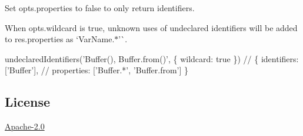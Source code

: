 Set {\ttfamily opts.\+properties} to false to only return identifiers.

When {\ttfamily opts.\+wildcard} is true, unknown uses of undeclared identifiers will be added to {\ttfamily res.\+properties} as `\textquotesingle{}Var\+Name.$\ast$'\`{}.


\begin{DoxyCode}
undeclaredIdentifiers('Buffer(), Buffer.from()', \{ wildcard: true \})
// \{ identifiers: ['Buffer'],
//   properties: ['Buffer.*', 'Buffer.from'] \}
\end{DoxyCode}


\subsection*{License}

\mbox{\hyperlink{md_LICENSE}{Apache-\/2.0}} 
